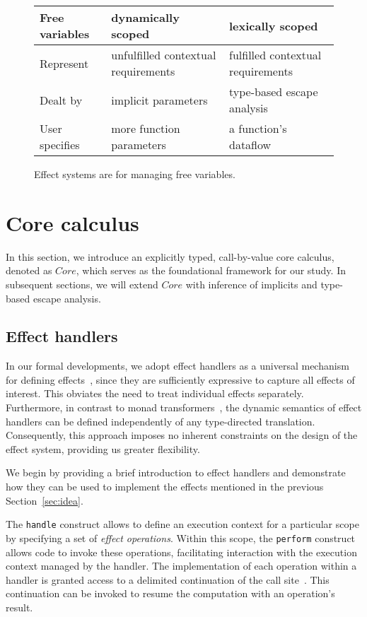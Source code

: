 \documentclass[acmsmall,review,screen]{acmart}
\begin{document}
\begin{figure}
    \centering
    \begin{tabular}{|l|l|l|}
        \hline
        Free variables & dynamically scoped & lexically scoped \\
        \hline
        Represent & unfulfilled contextual requirements & fulfilled contextual requirements \\
        Dealt by & implicit parameters & type-based escape analysis \\
        User specifies & more function parameters & a function’s dataflow \\
        \hline
    \end{tabular}
    \caption{Effect systems are for managing free variables.}
    \label{fig:free-vars}
\end{figure}


\section{Core calculus} \label{sec:core}

In this section, we introduce an explicitly typed, call-by-value core calculus, denoted as $Core$, which serves as the foundational framework for our study.
In subsequent sections, we will extend $Core$ with inference of implicits and type-based escape analysis.

\subsection{Effect handlers} \label{subsec:handlers}

In our formal developments, we adopt effect handlers as a universal mechanism for defining effects~\cite{plotkin2003algebraic, plotkin2013handling}, since they are sufficiently expressive to capture all effects of interest.
This obviates the need to treat individual effects separately.
Furthermore, in contrast to monad transformers~\cite{liang1995monad, schrijvers2019monad}, the dynamic semantics of effect handlers can be defined independently of any type-directed translation.
Consequently, this approach imposes no inherent constraints on the design of the effect system, providing us greater flexibility.

We begin by providing a brief introduction to effect handlers and demonstrate how they can be used to implement the effects mentioned in the previous Section~\ref{sec:idea}.

The \lstinline[language=colang]{handle} construct allows to define an execution context for a particular scope by specifying a set of \emph{effect operations}.
Within this scope, the \lstinline[language=colang]{perform} construct allows code to invoke these operations, facilitating interaction with the execution context managed by the handler.
The implementation of each operation within a handler is granted access to a delimited continuation of the call site~\cite{dyvbig2007monadic}.
This continuation can be invoked to resume the computation with an operation's result.
\end{document}
